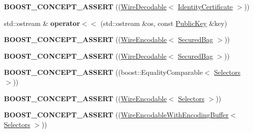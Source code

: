 \begin{DoxyCompactItemize}
\item 
{\bfseries B\+O\+O\+S\+T\+\_\+\+C\+O\+N\+C\+E\+P\+T\+\_\+\+A\+S\+S\+E\+RT} ((\hyperlink{classndn_1_1WireDecodable}{Wire\+Decodable}$<$ \hyperlink{classndn_1_1IdentityCertificate}{Identity\+Certificate} $>$))\hypertarget{namespacendn_a7ac21896c1d80a1a0026298d9882649f}{}\label{namespacendn_a7ac21896c1d80a1a0026298d9882649f}

\item 
std\+::ostream \& {\bfseries operator$<$$<$} (std\+::ostream \&os, const \hyperlink{classndn_1_1PublicKey}{Public\+Key} \&key)\hypertarget{namespacendn_a46c06d75c2c5535d545a07d64d0e9ae3}{}\label{namespacendn_a46c06d75c2c5535d545a07d64d0e9ae3}

\item 
{\bfseries B\+O\+O\+S\+T\+\_\+\+C\+O\+N\+C\+E\+P\+T\+\_\+\+A\+S\+S\+E\+RT} ((\hyperlink{classndn_1_1WireEncodable}{Wire\+Encodable}$<$ \hyperlink{classndn_1_1SecuredBag}{Secured\+Bag} $>$))\hypertarget{namespacendn_aea0a6ce35a485adcdb65be0c1e30387e}{}\label{namespacendn_aea0a6ce35a485adcdb65be0c1e30387e}

\item 
{\bfseries B\+O\+O\+S\+T\+\_\+\+C\+O\+N\+C\+E\+P\+T\+\_\+\+A\+S\+S\+E\+RT} ((\hyperlink{classndn_1_1WireDecodable}{Wire\+Decodable}$<$ \hyperlink{classndn_1_1SecuredBag}{Secured\+Bag} $>$))\hypertarget{namespacendn_a1db16b8e8fe1fcc497805bc7097eed07}{}\label{namespacendn_a1db16b8e8fe1fcc497805bc7097eed07}

\item 
{\bfseries B\+O\+O\+S\+T\+\_\+\+C\+O\+N\+C\+E\+P\+T\+\_\+\+A\+S\+S\+E\+RT} ((boost\+::\+Equality\+Comparable$<$ \hyperlink{classndn_1_1Selectors}{Selectors} $>$))\hypertarget{namespacendn_a43435bea14feab8b408672c1fb1d80d7}{}\label{namespacendn_a43435bea14feab8b408672c1fb1d80d7}

\item 
{\bfseries B\+O\+O\+S\+T\+\_\+\+C\+O\+N\+C\+E\+P\+T\+\_\+\+A\+S\+S\+E\+RT} ((\hyperlink{classndn_1_1WireEncodable}{Wire\+Encodable}$<$ \hyperlink{classndn_1_1Selectors}{Selectors} $>$))\hypertarget{namespacendn_a8cd129cf5dd78737435a2bfa022b199f}{}\label{namespacendn_a8cd129cf5dd78737435a2bfa022b199f}

\item 
{\bfseries B\+O\+O\+S\+T\+\_\+\+C\+O\+N\+C\+E\+P\+T\+\_\+\+A\+S\+S\+E\+RT} ((\hyperlink{classndn_1_1WireEncodableWithEncodingBuffer}{Wire\+Encodable\+With\+Encoding\+Buffer}$<$ \hyperlink{classndn_1_1Selectors}{Selectors} $>$))\hypertarget{namespacendn_a6075234d0d92209095d84c812198364d}{}\label{namespacendn_a6075234d0d92209095d84c812198364d}


\end{DoxyCompactItemize}
